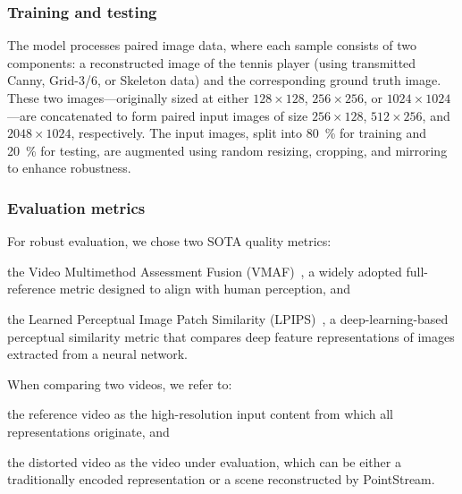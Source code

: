 \documentclass[manuscript, screen]{acmart}
\newcommand{\vxv}[2]{$#1\!\times\!#2$}
\begin{document}
\subsubsection*{Training and testing}
The model processes paired image data, where each sample consists of two components: a reconstructed image of the tennis player (using transmitted Canny, Grid-3/6, or Skeleton data) and the corresponding ground truth image. These two images—originally sized at either \vxv{128}{128}, \vxv{256}{256}, or \vxv{1024}{1024}—are concatenated to form paired input images of size \vxv{256}{128}, \vxv{512}{256}, and \vxv{2048}{1024}, respectively.
The input images, split into \qty{80}{\percent} for training and \qty{20}{\percent} for testing, are augmented using random resizing, cropping, and mirroring to enhance robustness.

\subsubsection*{Evaluation metrics}
For robust evaluation, we chose two SOTA quality metrics:
\begin{enumerate*}[label=\textit{(\roman*)}]
\item the Video Multimethod Assessment Fusion (VMAF)~\cite{li2018vmaf}, a widely adopted full-reference metric designed to align with human perception, and 
\item the Learned Perceptual Image Patch Similarity (LPIPS)~\cite{zhang2018lpips}, a deep-learning-based perceptual similarity metric that compares deep feature representations of images extracted from a neural network.
\end{enumerate*}
When comparing two videos, we refer to: 
\begin{enumerate*}[label=\textit{(\roman*)}]
\item the reference video as the high-resolution input content from which all representations originate, and
\item the distorted video as the video under evaluation, which can be either a traditionally encoded representation or a scene reconstructed by PointStream.
\end{enumerate*}
\end{document}
